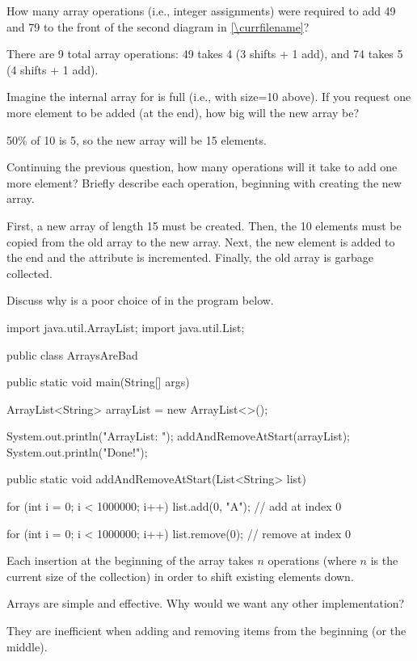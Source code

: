 \Q \label{arrayopers}
How many array operations (i.e., integer assignments) were required to add 49 and 79 to the front of the second diagram in \ref{\currfilename}?

\begin{answer}
There are 9 total array operations:
49 takes 4 (3 shifts + 1 add), and 74 takes 5 (4 shifts + 1 add).
\end{answer}


\Q Imagine the internal array for  is full (i.e., with size=10 above).
If you request one more element to be added (at the end), how big will the new array be?

\begin{answer}
50\% of 10 is 5, so the new array will be 15 elements.
\end{answer}


\Q Continuing the previous question, how many operations will it take to add one more element? Briefly describe each operation, beginning with creating the new array.

\begin{answer}[5em]
First, a new array of length 15 must be created.
Then, the 10 elements must be copied from the old array to the new array.
Next, the new element is added to the end and the  attribute is incremented.
Finally, the old array is garbage collected.
\end{answer}


\Q \label{ArraysAreBad}
Discuss why  is a poor choice of  in the program below.

\vspace{1ex}
\begin{javabox}
import java.util.ArrayList;
import java.util.List;

public class ArraysAreBad
{
    public static void main(String[] args)
    {
        ArrayList<String> arrayList = new ArrayList<>();

        System.out.println("ArrayList: ");
        addAndRemoveAtStart(arrayList);
        System.out.println("Done!");
    }

    public static void addAndRemoveAtStart(List<String> list)
    {
        for (int i = 0; i < 1000000; i++)
        {
            list.add(0, "A");  // add at index 0
        }

        for (int i = 0; i < 1000000; i++)
        {
            list.remove(0);  // remove at index 0
        }
    }
}
\end{javabox}
\vspace{-1ex}

\begin{answer}[3em]
Each insertion at the beginning of the array takes $n$ operations (where $n$ is the current size of the collection) in order to shift existing elements down.
\end{answer}


\Q Arrays are simple and effective. Why would we want any other implementation?

\begin{answer}
They are inefficient when adding and removing items from the beginning (or the middle).
\end{answer}
